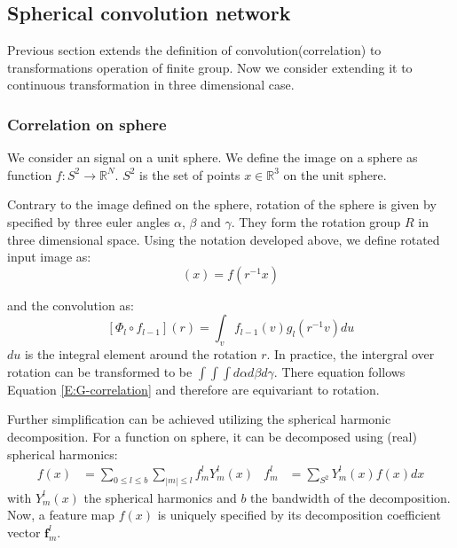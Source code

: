 \documentclass{IEEEtran}
\begin{document}
\subsection{Spherical convolution network}
Previous section extends the definition of convolution(correlation) to transformations operation of finite group. 
Now we consider extending it to continuous transformation\cite{cohen_spherical_2018} in three dimensional case. 

\subsubsection*{Correlation on sphere}
We consider an signal on a unit sphere. We define the image on a sphere as function $f\colon S^2 \to \mathbb{R}^N$.
$S^2$ is the set of points $x\in \mathbb{R}^3$ on the unit sphere.

Contrary to the image defined on the sphere, rotation of the sphere is given by specified by three
euler angles $\alpha$, $\beta$ and $\gamma$\cite{sakurai_modern_1994}. They form the 
rotation group $R$ in three dimensional space. 
Using the notation developed above, we define rotated input image as: 
\begin{equation}
    [\Psi_r \circ f] (x) = f(r^{-1}x)
\end{equation}

and the convolution as:
\begin{equation}
    \label{E:convolution_r}
    [\Phi_l \circ f_{l-1}] (r) = \int_v f_{l-1}(v)g_l(r^{-1}v) du 
\end{equation}
$du$ is the integral element around the rotation $r$. In practice, the intergral over rotation can be transformed 
to be $\int\int\int d\alpha d\beta d\gamma$. There equation follows Equation \eqref{E:G-correlation} and therefore 
are equivariant to rotation.

Further simplification can be achieved utilizing the spherical harmonic decomposition. For 
a function on sphere, it can be decomposed using (real) spherical harmonics:
\begin{align}
    f(x) &= \sum_{0\leq l \leq b} \sum_{|m|\leq l} f_m^l Y_m^l(x) &  f_m^l &= \sum_{S^2} Y_m^l(x) f(x) dx  
    \label{E:s2_fft}
\end{align}
with $Y_m^l(x)$ the spherical harmonics and $b$ the bandwidth of the decomposition. 
Now, a feature map $f(x)$ is uniquely specified by its decomposition coefficient vector $\mathbf{f}_m^l$. 
\end{document}

